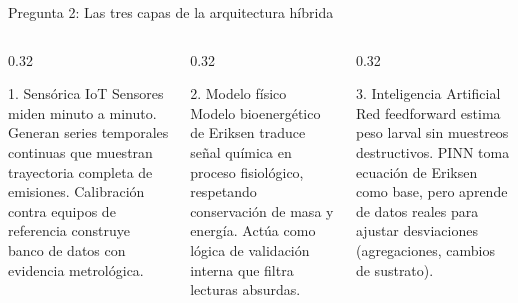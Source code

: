 \documentclass[aspectratio=169, 11pt]{beamer}
\newcommand{\NDIR}{\text{NDIR}}
\begin{document}
\begin{frame}{Pregunta 2: Las tres capas de la arquitectura híbrida}
\begin{columns}[T]
\begin{column}{0.32\textwidth}
\begin{block}{1. Sensórica IoT}
\footnotesize
Sensores \NDIR{} miden minuto a minuto. Generan series temporales continuas que muestran trayectoria completa de emisiones. Calibración contra equipos de referencia construye banco de datos con evidencia metrológica.
\end{block}
\end{column}
\begin{column}{0.32\textwidth}
\begin{block}{2. Modelo físico}
\footnotesize
Modelo bioenergético de Eriksen traduce señal química en proceso fisiológico, respetando conservación de masa y energía. Actúa como lógica de validación interna que filtra lecturas absurdas.
\end{block}
\end{column}
\begin{column}{0.32\textwidth}
\begin{exampleblock}{3. Inteligencia Artificial}
\footnotesize
Red feedforward estima peso larval sin muestreos destructivos. PINN toma ecuación de Eriksen como base, pero aprende de datos reales para ajustar desviaciones (agregaciones, cambios de sustrato).
\end{exampleblock}
\end{column}
\end{columns}
\end{frame}
\end{document}

